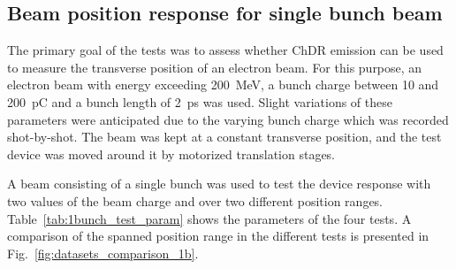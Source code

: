 \subsection{Beam position response for single bunch beam}\label{sec:single_bunch}

The primary goal of the tests was to assess whether ChDR emission can be used to measure the transverse position of an electron beam. For this purpose, an electron beam with energy exceeding 200~MeV, a bunch charge between 10 and 200~pC and a bunch length of 2~ps was used. Slight variations of these parameters were anticipated due to the varying bunch charge which was recorded shot-by-shot. The beam was kept at a constant transverse position, and the test device was moved around it by motorized translation stages. 


A beam consisting of a single bunch was used to test the device response with two values of the beam charge and over two different position ranges. Table~\ref{tab:1bunch_test_param} shows the parameters of the four tests. A comparison of the spanned position range in the different tests is presented in Fig.~\ref{fig:datasets_comparison_1b}.

